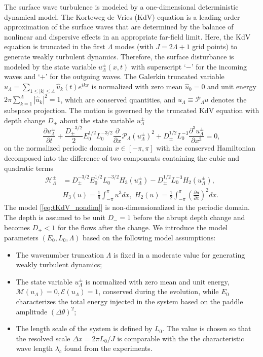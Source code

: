 \documentclass[9pt,twocolumn,twoside,lineno]{pnas-new}
\begin{document}
The surface wave turbulence is modeled by a one-dimensional deterministic
dynamical model. The Korteweg-de Vries (KdV) equation \cite{johnson1997modern}
is a leading-order approximation of the surface waves that are determined
by the balance of nonlinear and dispersive effects in an appropriate
far-field limit. Here, the KdV equation is truncated in the first
$\Lambda$ modes (with $J=2\Lambda+1$ grid points) to generate weakly
turbulent dynamics. Therefore, the surface disturbance is modeled by
the state variable $u_{\Lambda}^{\pm}\left(x,t\right)$ with superscript `$-$'
for the incoming waves and `$+$' for the outgoing waves. The Galerkin
truncated variable $u_{\Lambda}=\sum_{1\leq\left|k\right|\leq\Lambda}\hat{u}_{k}\left(t\right)e^{ikx}$
is normalized with zero mean $\hat{u}_{0}=0$ and unit energy $2\pi\sum_{k=1}^{\Lambda}\left|\hat{u}_{k}\right|^{2}=1$,
which are conserved quantities, and $u_{\Lambda}\equiv\mathcal{P}_{\Lambda}u$
denotes the subspace projection. The motion is governed by the truncated
KdV equation with depth change $D_{\pm}$ about the state variable
$u_{\Lambda}^{\pm}$
\begin{equation}
\frac{\partial u_{\Lambda}^{\pm}}{\partial t}+\frac{D_{\pm}^{-3/2}}{2}E_{0}^{1/2}L_{0}^{-3/2}\frac{\partial}{\partial x}\mathcal{P}_{\Lambda}\left(u_{\Lambda}^{\pm}\right)^{2}+D_{\pm}^{1/2}L_{0}^{-3}\frac{\partial^{3}u_{\Lambda}^{\pm}}{\partial x^{3}}=0,\label{eq:tKdV_nondim}
\end{equation}
on the normalized periodic domain $x\in\left[-\pi,\pi\right]$ with the conserved Hamiltonian decomposed into the difference of two
components containing the cubic and quadratic terms
\begin{align*}
\mathcal{H}_{\Lambda}^{\pm} & =  D_{\pm}^{-3/2}E_{0}^{1/2}L_{0}^{-3/2}H_{3}\left(u_{\Lambda}^{\pm}\right)-D_{\pm}^{1/2}L_{0}^{-3}H_{2}\left(u_{\Lambda}^{\pm}\right),\\
& H_{3}\left(u\right) =  \frac{1}{6}\int_{-\pi}^{\pi}u^{3}dx,\;H_{2}\left(u\right)=\frac{1}{2}\int_{-\pi}^{\pi}\left(\frac{\partial u}{\partial x}\right)^{2}dx.
\end{align*}
The model [\ref{eq:tKdV_nondim}] is non-dimensionalized in the periodic
domain. The depth is assumed to be unit $D_{-}=1$
before the abrupt depth change and becomes $D_{+}<1$ for the flows
after the change. We introduce the model parameters $\left(E_{0},L_{0},\Lambda\right)$
based on the following model assumptions:
\begin{itemize}
\item The wavenumber truncation $\Lambda$ is fixed in a moderate value
for generating weakly turbulent dynamics;
\item The state variable $u_{\Lambda}^{\pm}$ is normalized with zero mean
and unit energy, $\mathcal{M}\left(u_{\Lambda}\right)=0,\mathcal{E}\left(u_{\Lambda}\right)=1$,
conserved during the evolution, while $E_{0}$ characterizes the total
energy injected in the system based on the paddle amplitude $\left(\Delta\theta\right)^{2}$;
\item The length scale of the system is defined by $L_{0}$. The value is
chosen so that the resolved scale $\Delta x=2\pi L_{0}/J$ is comparable
with the the characteristic wave length $\lambda_{c}$ found from
the experiments.
\end{itemize}
\end{document}
